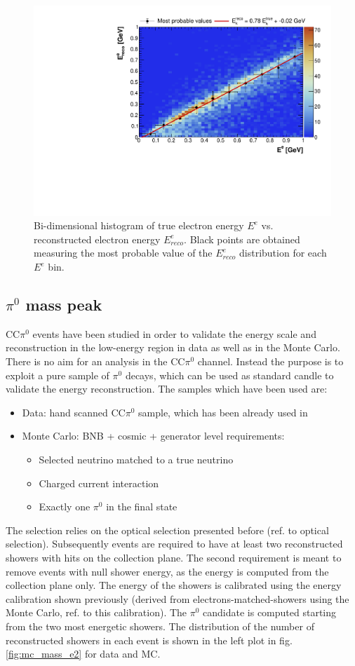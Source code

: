 \begin{figure}[htbp]
\centering
\includegraphics[width=0.65\columnwidth]{figures/ecalib.pdf}
\caption{Bi-dimensional histogram of true electron energy $E^{e}$ vs. reconstructed electron energy $E_{reco}^{e}$. Black points are obtained measuring the most probable value of the $E_{reco}^{e}$ distribution for each $E^{e}$ bin.}
\label{fig:ecalib}
\end{figure}



\subsection{\texorpdfstring{$\pi^0$}{pi0} mass peak}

CC$\pi^0$ events have been studied in order to validate the energy scale and reconstruction in the low-energy region in data as well as in the Monte Carlo. There is no aim for an analysis in the CC$\pi^0$ channel. Instead the purpose is to exploit a pure sample of $\pi^0$ decays, which can be used as standard candle to validate the energy reconstruction.
The samples which have been used are:
\begin{itemize}
  \item Data: hand scanned CC$\pi^0$ sample, which has been already used in \cite{caratelli}
  \item Monte Carlo: BNB + cosmic + generator level requirements:
  	\begin{itemize}
  		\item Selected neutrino matched to a true neutrino
		\item Charged current interaction
		\item Exactly one $\pi^0$ in the final state
  	\end{itemize}
\end{itemize}
The selection relies on the optical selection presented before (ref. to optical selection). Subsequently events are required to have at least two reconstructed showers with hits on the collection plane. The second requirement is meant to remove events with null shower energy, as the energy is computed from the collection plane only. The energy of the showers is calibrated using the energy calibration shown previously (derived from electrons-matched-showers using the Monte Carlo, ref. to this calibration).
The $\pi^0$ candidate is computed starting from the two most energetic showers. The distribution of the number of reconstructed showers in each event is shown in the left plot in fig. \ref{fig:mc_mass_e2} for data and MC.


